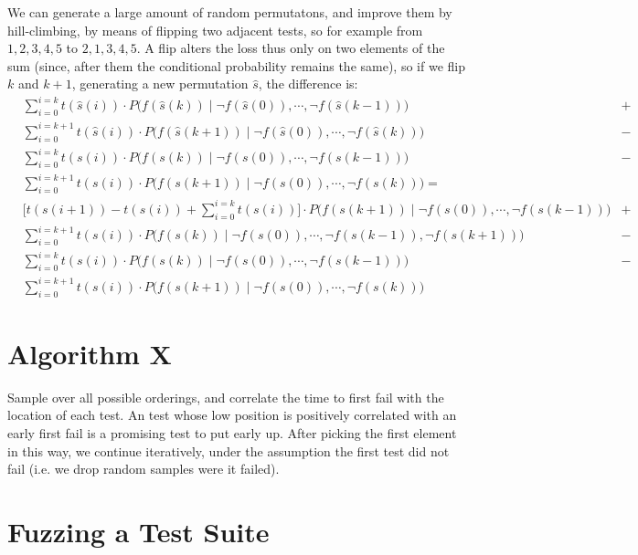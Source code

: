 \documentclass[12pt]{article}
\begin{document}
We can generate a large amount of random permutatons, and improve them by hill-climbing, by means of flipping two adjacent tests, so for example from $1,2,3,4,5$ to $2,1,3,4,5$. A flip alters the loss thus only on two elements of the sum (since, after them the conditional probability remains the same), so if we flip $k$ and $k+1$, generating a new permutation $\hat{s}$, the difference is:
\begin{align}
  &\sum_{i=0}^{i=k} t(\hat{s}(i)) \cdot P\Big(f(\hat{s}(k)) \; \Big| \; \neg f(\hat{s}(0)), \cdots, \neg f(\hat{s}(k-1)) \Big) &+ \\
  &\sum_{i=0}^{i=k+1} t(\hat{s}(i)) \cdot P\Big(f(\hat{s}(k+1)) \; \Big| \; \neg f(\hat{s}(0)), \cdots, \neg f(\hat{s}(k)) \Big) &- \\
  &\sum_{i=0}^{i=k} t(s(i)) \cdot P\Big(f(s(k)) \; \Big| \; \neg f(s(0)), \cdots, \neg f(s(k-1)) \Big) &- \\
  &\sum_{i=0}^{i=k+1} t(s(i)) \cdot P\Big(f(s(k+1)) \; \Big| \; \neg f(s(0)), \cdots, \neg f(s(k)) \Big) = \\
  &\Big[ t(s(i+1)) - t(s(i)) + \sum_{i=0}^{i=k} t(s(i)) \Big] \cdot P\Big(f(s(k+1)) \; \Big| \; \neg f(s(0)), \cdots, \neg f(s(k-1)) \Big) &+ \\
  &\sum_{i=0}^{i=k+1} t(s(i)) \cdot P\Big(f(s(k)) \; \Big| \; \neg f(s(0)), \cdots, \neg f(s(k-1)), \neg f(s(k+1)) \Big) &- \\
  &\sum_{i=0}^{i=k} t(s(i)) \cdot P\Big(f(s(k)) \; \Big| \; \neg f(s(0)), \cdots, \neg f(s(k-1)) \Big) &- \\
  &\sum_{i=0}^{i=k+1} t(s(i)) \cdot P\Big(f(s(k+1)) \; \Big| \; \neg f(s(0)), \cdots, \neg f(s(k)) \Big)
\end{align}

\section{Algorithm X}

Sample over all possible orderings, and correlate the time to first fail with the location of each test. An test whose low position is positively correlated with an early first fail is a promising test to put early up. After picking the first element in this way, we continue iteratively, under the assumption the first test did not fail (i.e. we drop random samples were it failed).

\section{Fuzzing a Test Suite}
\end{document}
